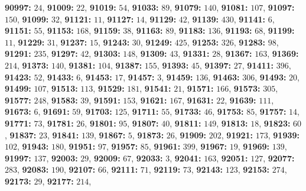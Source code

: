 \textsf{\bfseries 90997:} $24$, \textsf{\bfseries 91009:} $22$, \textsf{\bfseries 91019:} $54$, \textsf{\bfseries 91033:} $89$, \textsf{\bfseries 91079:} $140$, \textsf{\bfseries 91081:} $107$, \textsf{\bfseries 91097:} $150$, \textsf{\bfseries 91099:} $32$, \textsf{\bfseries 91121:} $11$, \textsf{\bfseries 91127:} $14$, \textsf{\bfseries 91129:} $42$, \textsf{\bfseries 91139:} $430$, \textsf{\bfseries 91141:} $6$, \textsf{\bfseries 91151:} $55$, \textsf{\bfseries 91153:} $168$, \textsf{\bfseries 91159:} $38$, \textsf{\bfseries 91163:} $89$, \textsf{\bfseries 91183:} $136$, \textsf{\bfseries 91193:} $68$, \textsf{\bfseries 91199:} $11$, \textsf{\bfseries 91229:} $31$, \textsf{\bfseries 91237:} $15$, \textsf{\bfseries 91243:} $30$, \textsf{\bfseries 91249:} $425$, \textsf{\bfseries 91253:} $326$, \textsf{\bfseries 91283:} $98$, \textsf{\bfseries 91291:} $235$, \textsf{\bfseries 91297:} $42$, \textsf{\bfseries 91303:} $148$, \textsf{\bfseries 91309:} $43$, \textsf{\bfseries 91331:} $28$, \textsf{\bfseries 91367:} $163$, \textsf{\bfseries 91369:} $214$, \textsf{\bfseries 91373:} $140$, \textsf{\bfseries 91381:} $104$, \textsf{\bfseries 91387:} $155$, \textsf{\bfseries 91393:} $45$, \textsf{\bfseries 91397:} $27$, \textsf{\bfseries 91411:} $396$, \textsf{\bfseries 91423:} $52$, \textsf{\bfseries 91433:} $6$, \textsf{\bfseries 91453:} $17$, \textsf{\bfseries 91457:} $3$, \textsf{\bfseries 91459:} $136$, \textsf{\bfseries 91463:} $306$, \textsf{\bfseries 91493:} $20$, \textsf{\bfseries 91499:} $107$, \textsf{\bfseries 91513:} $113$, \textsf{\bfseries 91529:} $181$, \textsf{\bfseries 91541:} $21$, \textsf{\bfseries 91571:} $166$, \textsf{\bfseries 91573:} $305$, \textsf{\bfseries 91577:} $248$, \textsf{\bfseries 91583:} $39$, \textsf{\bfseries 91591:} $153$, \textsf{\bfseries 91621:} $167$, \textsf{\bfseries 91631:} $22$, \textsf{\bfseries 91639:} $111$, \textsf{\bfseries 91673:} $6$, \textsf{\bfseries 91691:} $59$, \textsf{\bfseries 91703:} $125$, \textsf{\bfseries 91711:} $55$, \textsf{\bfseries 91733:} $46$, \textsf{\bfseries 91753:} $85$, \textsf{\bfseries 91757:} $14$, \textsf{\bfseries 91771:} $73$, \textsf{\bfseries 91781:} $26$, \textsf{\bfseries 91801:} $95$, \textsf{\bfseries 91807:} $40$, \textsf{\bfseries 91811:} $149$, \textsf{\bfseries 91813:} $18$, \textsf{\bfseries 91823:} $60$, \textsf{\bfseries 91837:} $23$, \textsf{\bfseries 91841:} $139$, \textsf{\bfseries 91867:} $5$, \textsf{\bfseries 91873:} $26$, \textsf{\bfseries 91909:} $202$, \textsf{\bfseries 91921:} $173$, \textsf{\bfseries 91939:} $102$, \textsf{\bfseries 91943:} $180$, \textsf{\bfseries 91951:} $97$, \textsf{\bfseries 91957:} $85$, \textsf{\bfseries 91961:} $399$, \textsf{\bfseries 91967:} $19$, \textsf{\bfseries 91969:} $139$, \textsf{\bfseries 91997:} $137$, \textsf{\bfseries 92003:} $29$, \textsf{\bfseries 92009:} $67$, \textsf{\bfseries 92033:} $3$, \textsf{\bfseries 92041:} $163$, \textsf{\bfseries 92051:} $127$, \textsf{\bfseries 92077:} $283$, \textsf{\bfseries 92083:} $190$, \textsf{\bfseries 92107:} $66$, \textsf{\bfseries 92111:} $71$, \textsf{\bfseries 92119:} $73$, \textsf{\bfseries 92143:} $123$, \textsf{\bfseries 92153:} $274$, \textsf{\bfseries 92173:} $29$, \textsf{\bfseries 92177:} $214$, 

